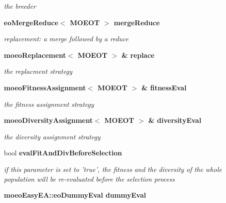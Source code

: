 \begin{CompactItemize}
\begin{CompactList}\small\item\em the breeder \item\end{CompactList}\item 
\bf{eo\-Merge\-Reduce}$<$ MOEOT $>$ \bf{merge\-Reduce}\label{classmoeoEasyEA_15a69654c07b24f9795add0a22f1f856}

\begin{CompactList}\small\item\em replacement: a merge followed by a reduce \item\end{CompactList}\item 
\bf{moeo\-Replacement}$<$ MOEOT $>$ \& \bf{replace}\label{classmoeoEasyEA_91611cf2862c2db953554e367a576244}

\begin{CompactList}\small\item\em the replacment strategy \item\end{CompactList}\item 
\bf{moeo\-Fitness\-Assignment}$<$ MOEOT $>$ \& \bf{fitness\-Eval}\label{classmoeoEasyEA_1268fc2f0b62fe51bca17d4efb51954b}

\begin{CompactList}\small\item\em the fitness assignment strategy \item\end{CompactList}\item 
\bf{moeo\-Diversity\-Assignment}$<$ MOEOT $>$ \& \bf{diversity\-Eval}\label{classmoeoEasyEA_b9d1b3790072dbbbe0012a252bab95f4}

\begin{CompactList}\small\item\em the diversity assignment strategy \item\end{CompactList}\item 
bool \bf{eval\-Fit\-And\-Div\-Before\-Selection}\label{classmoeoEasyEA_856a19d9a7c180fe33ce7a5bb010edcc}

\begin{CompactList}\small\item\em if this parameter is set to 'true', the fitness and the diversity of the whole population will be re-evaluated before the selection process \item\end{CompactList}\item 
\bf{moeo\-Easy\-EA::eo\-Dummy\-Eval} \bf{dummy\-Eval}\label{classmoeoEasyEA_f019dc52912af200ea846285532394de}


\end{CompactItemize}
